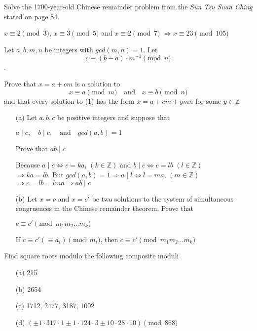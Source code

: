 \begin{exer}[2.19]
Solve the 1700-year-old Chinese remainder problem from the \textit{Sun Tzu Suan Ching} stated on page 84.

$x \equiv 2 \pmod 3$, $x \equiv 3 \pmod 5$ and $x \equiv 2 \pmod 7$ $\Rightarrow x \equiv 23 \pmod {105}$
\end{exer}

\begin{exer}[2.20]
Let $a,b,m,n$ be integers with $gcd(m,n)=1$. Let
\begin{equation*}
    c \equiv (b-a) \cdot m^{-1} \pmod n
\end{equation*}.

Prove that $x=a+cm$ is a solution to
\begin{equation}
    x \equiv a \pmod m \quad \text{and} \quad x\equiv b \pmod n
\end{equation}
and that every solution to (1) has the form $x=a+cm+ymn$ for some $y \in \mathbb{Z}$
\end{exer}

\begin{exer}[2.21]
\begin{enumerate}
    \item [(a)] Let $a,b,c$ be positive integers and suppose that \begin{center}$a \mid c, \quad b \mid c, \quad \text{and} \quad gcd(a,b)=1$\end{center} Prove that $ab \mid c$
    
    Because $a \mid c \Leftrightarrow c=ka$, $(k \in \mathbb{Z})$ and $b \mid c \Leftrightarrow c=lb$ $(l \in \mathbb{Z})$ \\ $\Rightarrow ka = lb$. But $gcd(a,b)=1 \Rightarrow a \mid l \Leftrightarrow l = ma$, $(m \in \mathbb{Z})$ \\ $\Rightarrow c=lb=lma  \Rightarrow ab \mid c$
    \item[(b)] Let $x=c$ and $x=c'$ be two solutions to the system of simultaneous congruences in the Chinese remainder theorem. Prove that \begin{center}$c \equiv c' \pmod{m_1m_2...m_k}$\end{center}
    If $c \equiv c' (\equiv a_i) \pmod m_i$, then $c \equiv c' \pmod{m_1m_2...m_k}$
\end{enumerate}
\end{exer}

\begin{exer}[2.23]
Find square roots modulo the following composite moduli
\begin{enumerate}
    \item [(a)] 215
    \item [(b)] 2654
    \item [(c)] 1712, 2477, 3187, 1002
    \item [(d)] $(\pm 1 \cdot 317 \cdot 1 \pm 1 \cdot 124 \cdot 3 \pm 10 \cdot 28 \cdot 10) \pmod{868}$
\end{enumerate}
\end{exer}

